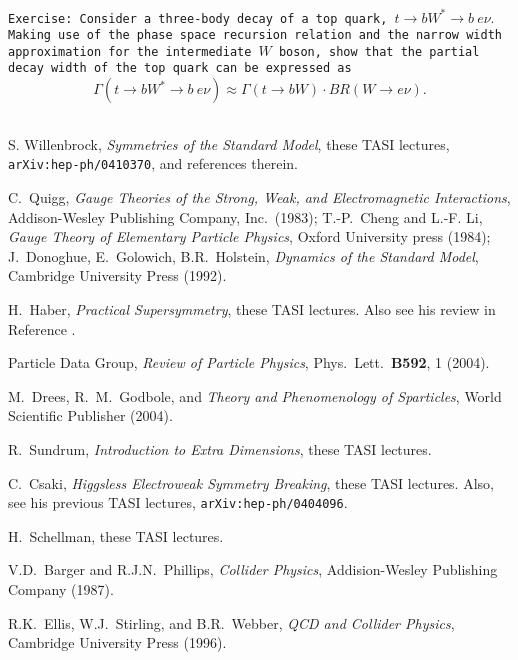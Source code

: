 \documentclass[prd,aps,floats,preprintnumbers,preprint,superscriptaddress,floatfix,nofootinbib]{revtex4}
\def\be{\begin{equation}}
\def\ee{\end{equation}}
\begin{document}
 {
\vskip 0.2cm
\noindent
\tt Exercise: Consider a three-body decay of a top quark, 
$t\to bW^* \to b\ e\nu.$
Making use of the phase space recursion relation and the narrow 
width approximation for the intermediate $W$ boson, show that the
partial decay width of the top quark can be expressed as
\be
\Gamma(t\to b W^* \to b\ e\nu) \approx \Gamma(t\to bW)\cdot BR(W\to e\nu).
\ee
\vskip 0.2cm
}


\begin{thebibliography}{99}

S. Willenbrock, {\it Symmetries of the Standard Model}, 
these TASI lectures, {\tt arXiv:hep-ph/0410370}, and references therein.

C.~Quigg, {\it Gauge Theories of the Strong, 
Weak, and Electromagnetic Interactions}, Addison-Wesley Publishing
Company, Inc.~(1983); 
T.-P.~Cheng and L.-F. Li, {\it Gauge Theory of Elementary
Particle Physics}, Oxford University press (1984);
J.~Donoghue, E.~Golowich, B.R.~Holstein,
{\it Dynamics of the Standard Model}, Cambridge University Press (1992).

H.~Haber, {\it Practical Supersymmetry}, 
these TASI lectures. Also see his review in Reference \cite{PDG}.

 Particle Data Group, {\it Review of Particle  Physics},
Phys.~Lett.~{\bf B592}, 1 (2004).

M.~Drees, R.~M.~Godbole, and  {\it Theory and
Phenomenology of Sparticles}, World Scientific Publisher (2004).

R.~Sundrum, {\it Introduction to Extra Dimensions}, 
these TASI lectures.

C.~Csaki, {\it Higgsless Electroweak 
Symmetry Breaking}, these TASI lectures. Also, see his previous
TASI lectures, {\tt arXiv:hep-ph/0404096}.

H.~Schellman, these TASI lectures.

 V.D.~Barger and R.J.N.~Phillips, {\it Collider Physics}, 
Addision-Wesley Publishing Company (1987).

 R.K.~Ellis, W.J.~Stirling, and B.R.~Webber, 
{\it QCD and Collider Physics}, 
Cambridge University Press (1996).


\end{thebibliography}
\end{document}
